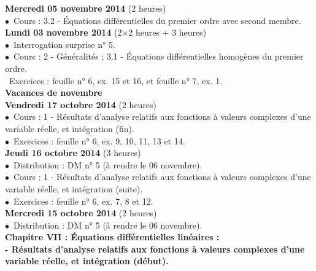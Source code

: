 \documentclass[12pt,a4paper]{article}
\begin{document}
\noindent\textbf{\bf Mercredi 05 novembre 2014 \rm} (2 heures)\\
$\bullet$\ Cours : 3.2 - Équations différentielles du premier ordre avec 
second membre.\vspace{.4cm}\\
 
\noindent\textbf{ Lundi 03 novembre 2014 \rm} (2$\times$2 heures + 3 heures)\\
$\bullet$\ Interrogation surprise n° 5.\\
$\bullet$\ Cours : 2 - Généralités ; 3.1 - Équations différentielles 
homogènes du premier ordre.\\
\bu\ Exercices : feuille n° 6, ex. 15 et 16, et feuille n° 7, ex.
1.\vspace{.4cm}\\

\noindent\textbf{ Vacances de novembre \rm}\\

\noindent\textbf{ \bf Vendredi 17 octobre 2014 \rm}(2 heures)\\
$\bullet$\ Cours : 1 - Résultats d'analyse relatifs aux fonctions à valeurs
complexes d'une variable réelle, et intégration (fin).\\
$\bullet$\ Exercices : feuille n° 6, ex. 9, 10, 11, 13 et 14.\vspace{.4cm}\\

\noindent\textbf{\bf Jeudi 16 octobre 2014 \rm} (3 heures)\\
$\bullet$\ Distribution : DM n° 5 (à rendre le 06 novembre).\\
$\bullet$\ Cours : 1 - Résultats d'analyse relatifs aux fonctions à valeurs
complexes d'une 
variable réelle, et intégration (suite).\\
$\bullet$\ Exercices : feuille n° 6, ex. 7, 8 et 12.\vspace{.4cm}\\

\noindent\textbf{\bf Mercredi 15 octobre 2014 \rm} (2 heures)\\
$\bullet$\ Distribution : DM n° 5 (à rendre le 06 novembre).\\
\bf Chapitre VII \rm : Équations différentielles linéaires :\\
 - Résultats d'analyse relatifs aux fonctions à valeurs complexes d'une 
variable réelle, et intégration (début).\vspace{.4cm}\\
\end{document}
